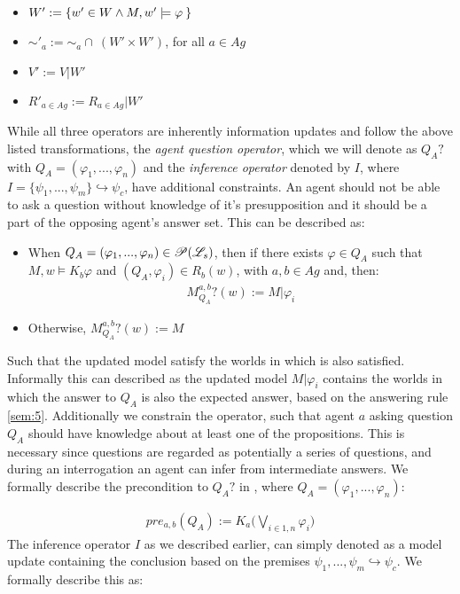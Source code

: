 \begin{itemize}
    \item $W' := \left\{ w' \in W \land M, w' \models \varphi\: \right\}$
    \item $\sim'_a := \sim_a \cap \:(W' \times W')$, for all $a \in Ag$
    \item $V' := V | W'$
    \item $R'_{a\in Ag} := R_{a\in Ag} | W'$
\end{itemize} 
While all three operators are inherently information updates and follow the above listed transformations, the \textit{agent question operator}, which we will denote as $Q_{A}?$ with $Q_A = (\varphi_1,...,\varphi_n)$ and the \textit{inference operator} denoted by $I$, where $I = \{\psi_1,...,\psi_m \}\hookrightarrow \psi_c$, have additional constraints. An agent should not be able to ask a question without knowledge of it's presupposition and it should be a part of the opposing agent's answer set. This can be described as:
\begin{itemize}
    \item When $Q_A = (\varphi_1,...,\varphi_n) \in \mathscr{P}(\mathscr{L}_s)$, then if there
          exists $\varphi \in Q_A$ such that $M, w \models K_b\varphi$ and $(Q_A,
              \varphi_i) \in R_b (w)$, with $a, b \in Ag$ and, then:
          \begin{align}
              M^{a,b}_{Q_A}?(w) := M |\varphi_i
          \end{align}
    \item Otherwise, $M^{a,b}_{Q_{A}}?(w) := M$
\end{itemize}
Such that the updated model satisfy the worlds in which \proposition\: is also satisfied. Informally this can described as the updated model $M|\varphi_i$ contains the worlds in which the answer to $Q_A$ is also the expected answer, based on the answering rule \cref{sem:5}. Additionally we constrain the operator, such that agent $a$ asking question $Q_A$ should have knowledge about at least one of the propositions. This is necessary since questions are regarded as potentially a series of questions, and during an interrogation an agent can infer from intermediate answers. We formally describe the precondition to $Q_A?$ in \dynlang, where $Q_A = (\varphi_1,...,\varphi_n)$:

\begin{gather}
    pre_{a,b}(Q_A) := K_a\Biggl(\bigvee\limits_{i\in 1,n}\varphi_i\Biggr)
\end{gather}
The inference operator $I$ as we described earlier, can simply denoted as a model update containing the conclusion based on the premises ${\psi_1,...,\psi_m} \hookrightarrow \psi_c$. We formally describe this as:


